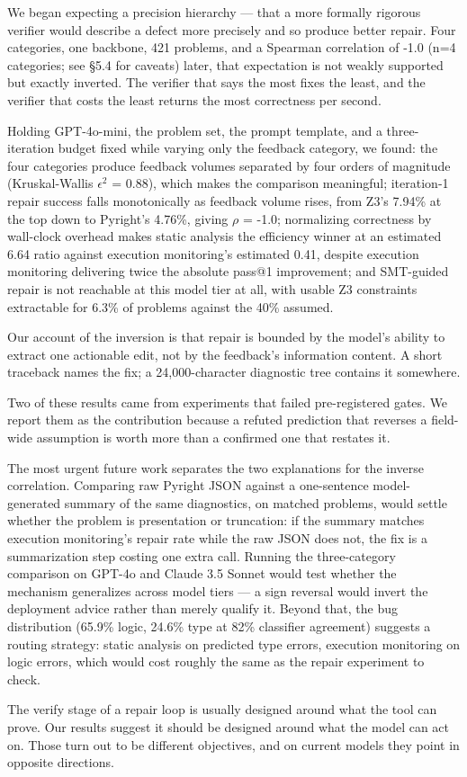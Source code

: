 
We began expecting a precision hierarchy --- that a more formally rigorous verifier would describe a defect more precisely and so produce better repair. Four categories, one backbone, 421 problems, and a Spearman correlation of -1.0 (n=4 categories; see §5.4 for caveats) later, that expectation is not weakly supported but exactly inverted. The verifier that says the most fixes the least, and the verifier that costs the least returns the most correctness per second.

Holding GPT-4o-mini, the problem set, the prompt template, and a three-iteration budget fixed while varying only the feedback category, we found: the four categories produce feedback volumes separated by four orders of magnitude (Kruskal-Wallis $\epsilon ^2$ = 0.88), which makes the comparison meaningful; iteration-1 repair success falls monotonically as feedback volume rises, from Z3's 7.94\% at the top down to Pyright's 4.76\%, giving $\rho$ = -1.0; normalizing correctness by wall-clock overhead makes static analysis the efficiency winner at an estimated 6.64 ratio against execution monitoring's estimated 0.41, despite execution monitoring delivering twice the absolute pass@1 improvement; and SMT-guided repair is not reachable at this model tier at all, with usable Z3 constraints extractable for 6.3\% of problems against the 40\% assumed.

Our account of the inversion is that repair is bounded by the model's ability to extract one actionable edit, not by the feedback's information content. A short traceback names the fix; a 24,000-character diagnostic tree contains it somewhere.

Two of these results came from experiments that failed pre-registered gates. We report them as the contribution because a refuted prediction that reverses a field-wide assumption is worth more than a confirmed one that restates it.

The most urgent future work separates the two explanations for the inverse correlation. Comparing raw Pyright JSON against a one-sentence model-generated summary of the same diagnostics, on matched problems, would settle whether the problem is presentation or truncation: if the summary matches execution monitoring's repair rate while the raw JSON does not, the fix is a summarization step costing one extra call. Running the three-category comparison on GPT-4o and Claude 3.5 Sonnet would test whether the mechanism generalizes across model tiers --- a sign reversal would invert the deployment advice rather than merely qualify it. Beyond that, the bug distribution (65.9\% logic, 24.6\% type at 82\% classifier agreement) suggests a routing strategy: static analysis on predicted type errors, execution monitoring on logic errors, which would cost roughly the same as the repair experiment to check.

The verify stage of a repair loop is usually designed around what the tool can prove. Our results suggest it should be designed around what the model can act on. Those turn out to be different objectives, and on current models they point in opposite directions.


